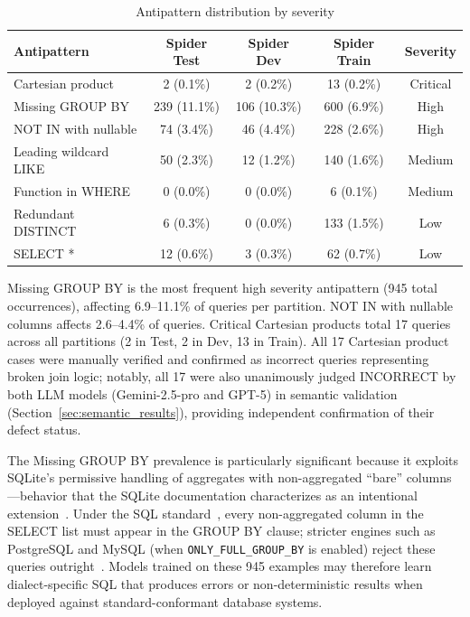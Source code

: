 \documentclass[print]{einformatica}
\begin{document}
\begin{table}[ht]
    \caption{Antipattern distribution by severity}
    \label{tab:antipatterns_top5}
    \centering
    \footnotesize
    \begin{tabular}{lcccc}
        \toprule
        \textbf{Antipattern} & \textbf{Spider Test} & \textbf{Spider Dev} & \textbf{Spider Train} & \textbf{Severity} \\
        \midrule
        Cartesian product & 2 (0.1\%) & 2 (0.2\%) & 13 (0.2\%) & Critical \\
        Missing GROUP BY & 239 (11.1\%) & 106 (10.3\%) & 600 (6.9\%) & High \\
        NOT IN with nullable & 74 (3.4\%) & 46 (4.4\%) & 228 (2.6\%) & High \\
        Leading wildcard LIKE & 50 (2.3\%) & 12 (1.2\%) & 140 (1.6\%) & Medium \\
        Function in WHERE & 0 (0.0\%) & 0 (0.0\%) & 6 (0.1\%) & Medium \\
        Redundant DISTINCT & 6 (0.3\%) & 0 (0.0\%) & 133 (1.5\%) & Low \\
        SELECT * & 12 (0.6\%) & 3 (0.3\%) & 62 (0.7\%) & Low \\
        \bottomrule
    \end{tabular}
\end{table}

Missing GROUP BY is the most frequent high severity antipattern (945 total occurrences), affecting 6.9--11.1\% of queries per partition. NOT IN with nullable columns affects 2.6--4.4\% of queries. Critical Cartesian products total 17 queries across all partitions (2 in Test, 2 in Dev, 13 in Train). All 17 Cartesian product cases were manually verified and confirmed as incorrect queries representing broken join logic; notably, all 17 were also unanimously judged INCORRECT by both LLM models (Gemini-2.5-pro and GPT-5) in semantic validation (Section~\ref{sec:semantic_results}), providing independent confirmation of their defect status.

The Missing GROUP BY prevalence is particularly significant because it exploits SQLite's permissive handling of aggregates with non-aggregated ``bare'' columns---behavior that the SQLite documentation characterizes as an intentional extension~\cite{sqliteBareColumns}. Under the SQL standard~\cite{iso9075_2_2016}, every non-aggregated column in the SELECT list must appear in the GROUP BY clause; stricter engines such as PostgreSQL and MySQL (when \texttt{ONLY\_FULL\_GROUP\_BY} is enabled) reject these queries outright~\cite{postgresGroupBy,mysqlGroupByHandling}. Models trained on these 945 examples may therefore learn dialect-specific SQL that produces errors or non-deterministic results when deployed against standard-conformant database systems.
\end{document}
